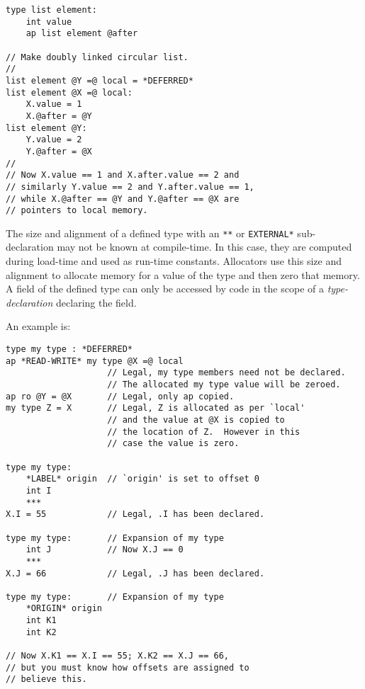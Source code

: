 \documentclass[12pt]{article}
\newenvironment{indpar}[1][0.3in]%
	{\begin{list}{}%
		     {\setlength{\itemsep}{0in}%
		      \setlength{\topsep}{0in}%
		      \setlength{\parsep}{1ex}%
		      \setlength{\labelwidth}{#1}%
		      \setlength{\leftmargin}{#1}%
		      \addtolength{\leftmargin}{\labelsep}}%
	 \item}%
	{\end{list}}
\begin{document}
\begin{indpar}\begin{verbatim}
type list element:
    int value
    ap list element @after

// Make doubly linked circular list.
//
list element @Y =@ local = *DEFERRED*
list element @X =@ local:
    X.value = 1
    X.@after = @Y
list element @Y:
    Y.value = 2
    Y.@after = @X
//
// Now X.value == 1 and X.after.value == 2 and
// similarly Y.value == 2 and Y.after.value == 1,
// while X.@after == @Y and Y.@after == @X are
// pointers to local memory.
\end{verbatim}\end{indpar}

The size and alignment of a defined type with an {\tt ***}
or {\tt *EXTERNAL*}
sub-declara\-tion may not be known at compile-time.
In this case, they are computed
during load-time and used as run-time constants.
Allocators use this size and alignment to allocate memory for a value of
the type and then zero that memory.
A field of
the defined type can only be accessed by code in the scope
of a {\em type-declaration} declaring the field.

An example is:

\begin{indpar}\begin{verbatim}
type my type : *DEFERRED*
ap *READ-WRITE* my type @X =@ local
                    // Legal, my type members need not be declared.
                    // The allocated my type value will be zeroed.
ap ro @Y = @X       // Legal, only ap copied.
my type Z = X       // Legal, Z is allocated as per `local'
                    // and the value at @X is copied to
                    // the location of Z.  However in this
                    // case the value is zero.

type my type:
    *LABEL* origin  // `origin' is set to offset 0
    int I
    ***
X.I = 55            // Legal, .I has been declared.

type my type:       // Expansion of my type
    int J           // Now X.J == 0
    ***
X.J = 66            // Legal, .J has been declared.

type my type:       // Expansion of my type
    *ORIGIN* origin
    int K1
    int K2

// Now X.K1 == X.I == 55; X.K2 == X.J == 66,
// but you must know how offsets are assigned to
// believe this.
\end{verbatim}\end{indpar}
\end{document}
